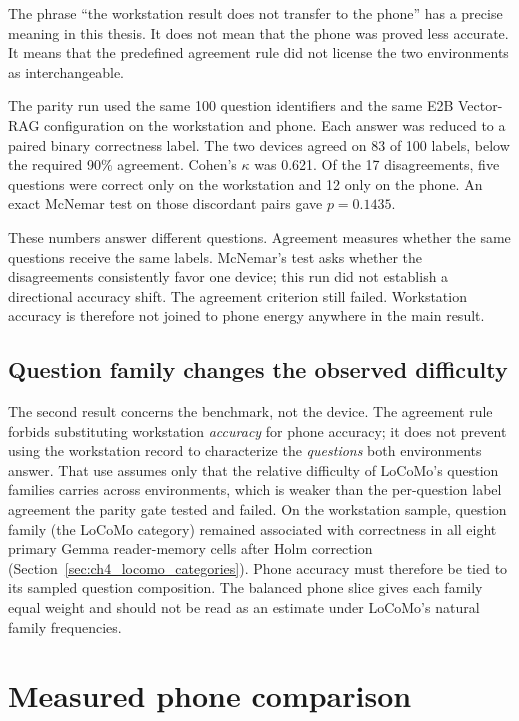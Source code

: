 The phrase ``the workstation result does not transfer to the phone'' has a precise
meaning in this thesis. It does not mean that the phone was proved less accurate. It
means that the predefined agreement rule did not license the two environments as
interchangeable.

The parity run used the same 100 question identifiers and the same E2B Vector-RAG
configuration on the workstation and phone. Each answer was reduced to a paired binary
correctness label. The two devices agreed on 83 of 100 labels, below the required 90\%
agreement. Cohen's $\kappa$ was 0.621. Of the 17 disagreements, five questions were
correct only on the workstation and 12 only on the phone. An exact McNemar test on those
discordant pairs gave $p=0.1435$.

These numbers answer different questions. Agreement measures whether the same questions
receive the same labels. McNemar's test asks whether the disagreements consistently
favor one device; this run did not establish a directional accuracy shift. The agreement
criterion still failed. Workstation accuracy is therefore not joined to phone energy anywhere in
the main result.

\subsection{Question family changes the observed difficulty}
\label{sec:ch5_question_families}

The second result concerns the benchmark, not the device. The agreement rule
forbids substituting workstation \emph{accuracy} for phone accuracy; it does not prevent
using the workstation record to characterize the \emph{questions} both environments
answer. That use assumes only that the relative difficulty of LoCoMo's question families
carries across environments, which is weaker than the per-question label agreement the
parity gate tested and failed. On the workstation sample, question family (the LoCoMo
category) remained associated with correctness in all eight primary Gemma reader-memory
cells after Holm correction (Section~\ref{sec:ch4_locomo_categories}). Phone accuracy
must therefore be tied to its sampled question composition. The balanced phone slice
gives each family equal weight and should not be read as an estimate under LoCoMo's
natural family frequencies.

\section{Measured phone comparison}
\label{sec:ch5_phone_comparison}

